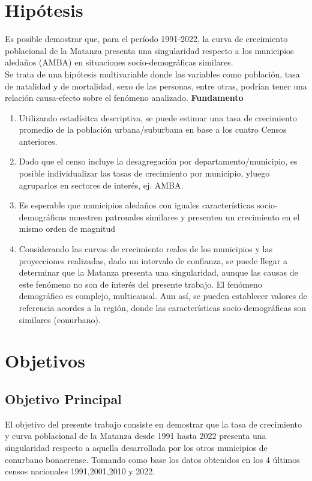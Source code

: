 \documentclass{article}
\theoremstyle{mytheoremstyle}
\theoremstyle{mytheoremstyle}
\theoremstyle{myproblemstyle}
\begin{document}
\section{Hipótesis}
Es posible demostrar que, para el período 1991-2022, la curva de crecimiento poblacional de la Matanza presenta una singularidad respecto a los municipios aledaños (AMBA) en situaciones socio-demográficas 
similares. \\
Se trata de una hipótesis multivariable donde las variables como población, tasa de natalidad y de mortalidad, sexo de las personas, entre otras, podrían tener una relación causa-efecto sobre el fenómeno analizado.\newline
\smallskip
\textbf{Fundamento}
\begin{enumerate}
  \item Utilizando estadísitca descriptiva, se puede estimar una tasa de crecimiento promedio de la población urbana/suburbana en base a los cuatro Censos anteriores.
  \item Dado que el censo incluye la desagregación por departamento/municipio, es posible individualizar las tasas de crecimiento por municipio, yluego agruparlos en sectores de interés, ej. AMBA.
 \item Es esperable que municipios aledaños con iguales características socio-demográficas muestren patronales similares y presenten un crecimiento en el mismo orden de magnitud
  \item Considerando las curvas de crecimiento reales de los municipios y las proyecciones realizadas, dado un intervalo de confianza, se puede llegar a determinar que la Matanza presenta una singularidad, 
aunque las causas de este fenómeno no son de interés del presente trabajo. El fenómeno demográfico es complejo, multicausal. Aun así, se pueden establecer valores de referencia acordes a la región, donde las características socio-demográficas son similares (conurbano).
\end{enumerate}


\section{Objetivos }
 \subsection{Objetivo Principal}
El objetivo del presente trabajo consiste en demostrar que la tasa de crecimiento y 
curva poblacional de la Matanza desde 1991 hasta 2022 presenta una singularidad respecto 
a aquella desarrollada por los otros municipios de conurbano bonaerense. 
Tomando como base los datos obtenidos en los 4 últimos censos nacionales 1991,2001,2010 y 2022.  
\end{document}
